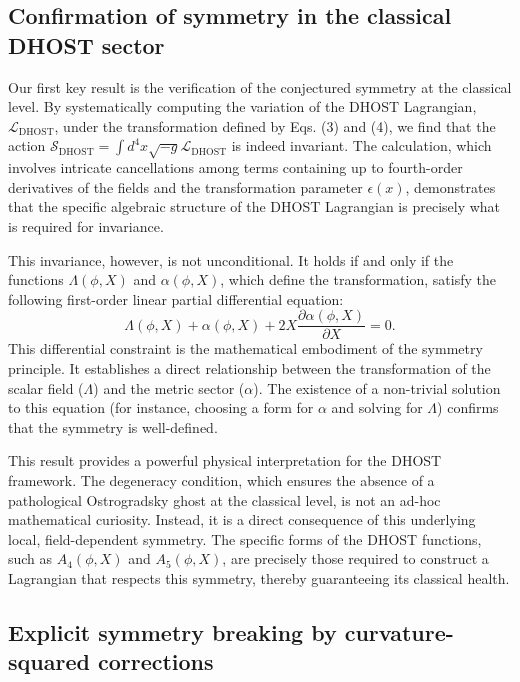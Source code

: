 \documentclass[twocolumn]{aastex631}
\begin{document}
\subsection{Confirmation of symmetry in the classical DHOST sector}

Our first key result is the verification of the conjectured symmetry at the classical level. By systematically computing the variation of the DHOST Lagrangian, $\mathcal{L}_{\text{DHOST}}$, under the transformation defined by Eqs. (3) and (4), we find that the action $\mathcal{S}_{\text{DHOST}} = \int d^4x \sqrt{-g} \mathcal{L}_{\text{DHOST}}$ is indeed invariant. The calculation, which involves intricate cancellations among terms containing up to fourth-order derivatives of the fields and the transformation parameter $\epsilon(x)$, demonstrates that the specific algebraic structure of the DHOST Lagrangian is precisely what is required for invariance.

This invariance, however, is not unconditional. It holds if and only if the functions $\Lambda(\phi, X)$ and $\alpha(\phi, X)$, which define the transformation, satisfy the following first-order linear partial differential equation:
\begin{equation}
\Lambda(\phi, X) + \alpha(\phi, X) + 2X \frac{\partial \alpha(\phi, X)}{\partial X} = 0.
\label{eq:dhost_condition}
\end{equation}
This differential constraint is the mathematical embodiment of the symmetry principle. It establishes a direct relationship between the transformation of the scalar field ($\Lambda$) and the metric sector ($\alpha$). The existence of a non-trivial solution to this equation (for instance, choosing a form for $\alpha$ and solving for $\Lambda$) confirms that the symmetry is well-defined.

This result provides a powerful physical interpretation for the DHOST framework. The degeneracy condition, which ensures the absence of a pathological Ostrogradsky ghost at the classical level, is not an ad-hoc mathematical curiosity. Instead, it is a direct consequence of this underlying local, field-dependent symmetry. The specific forms of the DHOST functions, such as $A_4(\phi, X)$ and $A_5(\phi, X)$, are precisely those required to construct a Lagrangian that respects this symmetry, thereby guaranteeing its classical health.

\subsection{Explicit symmetry breaking by curvature-squared corrections}
\end{document}
